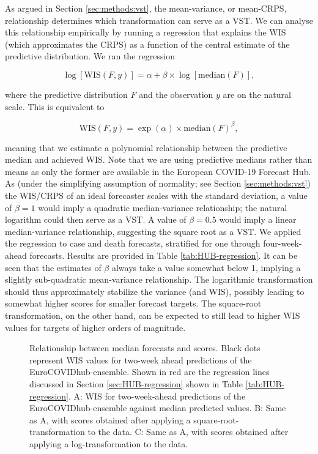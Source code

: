 \documentclass[10pt,letterpaper]{article}
\begin{document}
As argued in Section \ref{sec:methods:vst}, the mean-variance, or mean-CRPS, relationship determines which transformation can serve as a VST. We can analyse this relationship empirically by running a regression that explains the WIS (which approximates the CRPS) as a function of the central estimate of the predictive distribution. We ran the regression
\begin{linenomath*}
\begin{equation}
    \log[\text{WIS}(F, y)] = \alpha + \beta \times \log[\text{median}(F)], 
\end{equation}
\end{linenomath*}
where the predictive distribution $F$ and the observation $y$ are on the natural scale. This is equivalent to
\begin{linenomath*}
\begin{equation}
    \text{WIS}(F, y) = \exp(\alpha) \times \text{median}(F)^\beta, 
\end{equation}
\end{linenomath*}
meaning that we estimate a polynomial relationship between the predictive median and achieved WIS. Note that we are using predictive medians rather than means as only the former are available in the European COVID-19 Forecast Hub. As (under the simplifying assumption of normality; see Section \ref{sec:methods:vst}) the WIS/CRPS of an ideal forecaster scales with the standard deviation, a value of $\beta = 1$ would imply a quadratic median-variance relationship; the natural logarithm could then serve as a VST. A value of $\beta = 0.5$ would imply a linear median-variance relationship, suggesting the square root as a VST. We applied the regression to case and death forecasts, stratified for one through four-week-ahead forecasts. Results are provided in Table \ref{tab:HUB-regression}. It can be seen that the estimates of $\beta$ always take a value somewhat below 1, implying a slightly sub-quadratic mean-variance relationship. The logarithmic transformation should thus approximately stabilize the variance (and WIS), possibly leading to somewhat higher scores for smaller forecast targets. The square-root transformation, on the other hand, can be expected to still lead to higher WIS values for targets of higher orders of magnitude.

\begin{figure}[h!]
    \centering
    \caption{Relationship between median forecasts and scores. Black dots represent WIS values for two-week ahead predictions of the EuroCOVIDhub-ensemble. Shown in red are the regression lines discussed in Section \ref{sec:HUB-regression} shown in Table \ref{tab:HUB-regression}. A: WIS for two-week-ahead predictions of the EuroCOVIDhub-ensemble against median predicted values. B: Same as A, with scores obtained after applying a square-root-transformation to the data. C: Same as A, with scores obtained after applying a log-transformation to the data.} 
    \label{fig:HUB-regression}
\end{figure}
\end{document}
